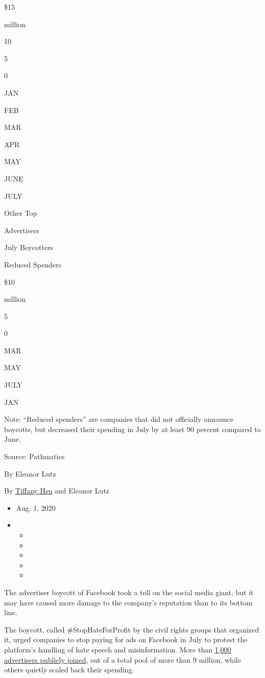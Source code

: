 \$15

million

10

5

0

JAN

FEB

MAR

APR

MAY

JUNE

JULY

Other Top

Advertisers

July Boycotters

Reduced Spenders

\$10

million

5

0

MAR

MAY

JULY

JAN

Note: ``Reduced spenders'' are companies that did not officially
announce boycotts, but decreased their spending in July by at least 90
percent compared to June.

Source: Pathmatics

By Eleanor Lutz

By \href{https://www.nytimes.com/by/tiffany-hsu}{Tiffany Hsu} and
Eleanor Lutz

\begin{itemize}
\item
  Aug. 1, 2020
\item
  \begin{itemize}
  \item
  \item
  \item
  \item
  \item
  \end{itemize}
\end{itemize}

The advertiser boycott of Facebook took a toll on the social media
giant, but it may have caused more damage to the company's reputation
than to its bottom line.

The boycott, called \#StopHateForProfit by the civil rights groups that
organized it, urged companies to stop paying for ads on Facebook in July
to protest the platform's handling of hate speech and misinformation.
More than
\href{https://www.nytimes.com/2020/06/26/business/media/Facebook-advertising-boycott.html}{1,000
advertisers publicly joined}, out of a total pool of more than 9
million, while others quietly scaled back their spending.

